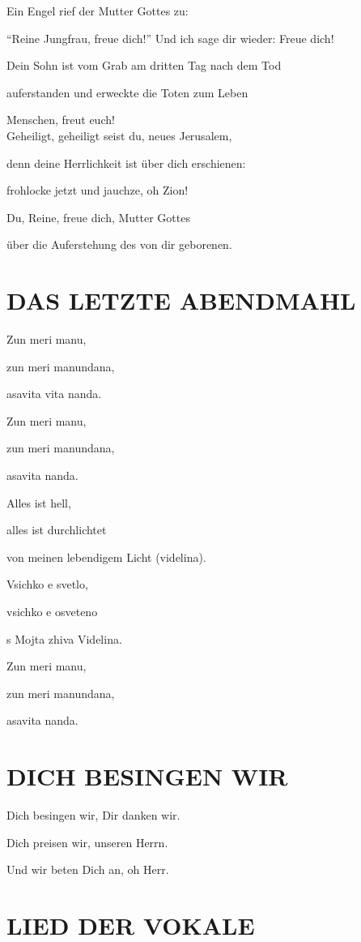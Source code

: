 \documentclass[11pt,a5paper,twoside]{article}
\begin{document}
Ein Engel rief der Mutter Gottes zu:

"`Reine Jungfrau, freue dich!"' Und ich sage dir wieder: Freue dich!

Dein Sohn ist vom Grab am dritten Tag nach dem Tod

auferstanden und erweckte die Toten zum Leben

Menschen, freut euch!\\

Geheiligt, geheiligt seist du, neues Jerusalem, 

denn deine Herrlichkeit ist über dich erschienen: 

frohlocke jetzt und jauchze, oh Zion!

Du, Reine, freue dich, Mutter Gottes

über die Auferstehung des von dir geborenen.



\section[Das letzte Abendmahl]{DAS LETZTE ABENDMAHL}

Zun meri manu,

zun meri manundana,

asavita vita nanda.

Zun meri manu,

zun meri manundana,

asavita nanda.

Alles ist hell,

alles ist durchlichtet

von meinen lebendigem Licht (videlina).

Vsichko e svetlo,

vsichko e osveteno

s Mojta zhiva Videlina.

Zun meri manu,

zun meri manundana,

asavita nanda.

\section[Dich bedingen wir]{DICH BESINGEN WIR}

Dich besingen wir, Dir danken wir.

Dich preisen wir, unseren Herrn.

Und wir beten Dich an, oh Herr.

\section[Lied der Vokale]{LIED DER VOKALE}
\end{document}
